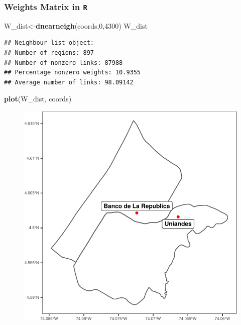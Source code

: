 \documentclass[
  shownotes,
  xcolor={svgnames},
  hyperref={colorlinks,citecolor=DarkBlue,linkcolor=DarkRed,urlcolor=DarkBlue}
   , aspectratio=169]{beamer}
\newenvironment{Shaded}{\begin{snugshade}}{\end{snugshade}}
\newcommand{\DecValTok}[1]{\textcolor[rgb]{0.00,0.00,0.81}{#1}}
\newcommand{\KeywordTok}[1]{\textcolor[rgb]{0.13,0.29,0.53}{\textbf{#1}}}
\newcommand{\NormalTok}[1]{#1}
\begin{document}
\begin{frame}[fragile]
\frametitle{Weights Matrix in \texttt{R}}

\begin{scriptsize}
\begin{Shaded}
\begin{Highlighting}[]
\NormalTok{W\_dist\textless{}{-}}\KeywordTok{dnearneigh}\NormalTok{(coords,}\DecValTok{0}\NormalTok{,}\DecValTok{4300}\NormalTok{)}
\NormalTok{W\_dist}
\end{Highlighting}
\end{Shaded}
\end{scriptsize}

\begin{tiny}
\begin{verbatim}
## Neighbour list object:
## Number of regions: 897 
## Number of nonzero links: 87988 
## Percentage nonzero weights: 10.9355 
## Average number of links: 98.09142
\end{verbatim}
\end{tiny}

\begin{scriptsize}
\begin{Shaded}
\begin{Highlighting}[]
\KeywordTok{plot}\NormalTok{(W\_dist, coords)}
\end{Highlighting}
\end{Shaded}
\end{scriptsize}


 \begin{figure}[H] \centering
    \captionsetup{justification=centering}
    \includegraphics[scale=0.7]{figures/unnamed-chunk-4-1.pdf}
   \end{figure}



\end{frame}




\end{document}
